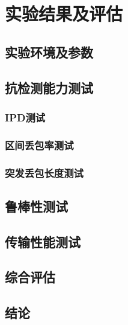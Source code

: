\section{实验结果及评估}
\label{chap:hash:result}

\subsection{实验环境及参数}
\label{chap:hash:result:parameters}

\subsection{抗检测能力测试}
\label{chap:hash:result:undetectability}

\subsubsection{IPD测试}
\label{chap:hash:result:undetectability:ipd}

\subsubsection{区间丢包率测试}
\label{chap:hash:result:undetectability:ipd}

\subsubsection{突发丢包长度测试}
\label{chap:hash:result:undetectability:ipd}

\subsection{鲁棒性测试}
\label{chap:hash:result:robustness}

\subsection{传输性能测试}
\label{chap:hash:result:throughput}

\subsection{综合评估}
\label{chap:hash:result:evaluation}

\subsection{结论}
\label{chap:hash:result:conclusion}